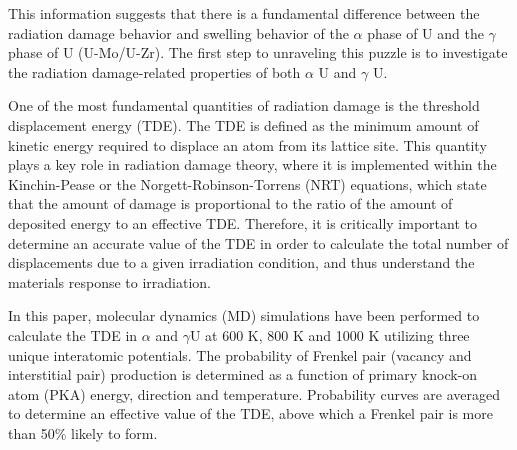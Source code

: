 \documentclass[review]{elsarticle}
\begin{document}
This information suggests that there is a fundamental difference between the radiation damage behavior and swelling behavior of the $\alpha$ phase of U and the $\gamma$ phase of U (U-Mo/U-Zr). The first step to unraveling this puzzle is to investigate the radiation damage-related properties of both $\alpha$ U and $\gamma$ U.

One of the most fundamental quantities of radiation damage is the threshold displacement energy (TDE). The TDE is defined as the minimum amount of kinetic energy required to displace an atom from its lattice site. This quantity plays a key role in radiation damage theory, where it is implemented within the Kinchin-Pease \cite{kinchinpease} or the Norgett-Robinson-Torrens (NRT) \cite{norgett1975} equations, which state that the amount of damage is proportional to the ratio of the amount of deposited energy to an effective TDE. Therefore, it is critically important to determine an accurate value of the TDE in order to calculate the total number of displacements due to a given irradiation condition, and thus understand the materials response to irradiation.

In this paper, molecular dynamics (MD) simulations have been performed to calculate the TDE in $\alpha$ and $\gamma$U at 600 K, 800 K and 1000 K utilizing three unique interatomic potentials. The probability of Frenkel pair (vacancy and interstitial pair) production is determined as a function of primary knock-on atom (PKA) energy, direction and temperature. Probability curves are averaged to determine an effective value of the TDE, above which a Frenkel pair is more than 50$\%$ likely to form. 
\end{document}
